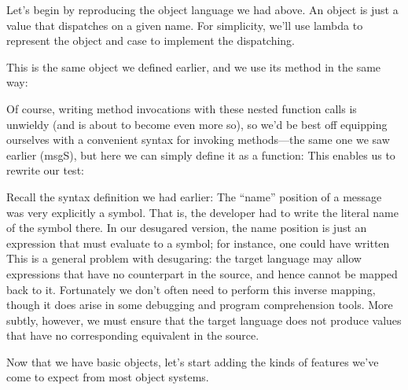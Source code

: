 
Let’s begin by reproducing the object language we had above. An object is just a
value that dispatches on a given name. For simplicity, we’ll use lambda to
represent the object and case to implement the dispatching.

This is the same object we defined earlier, and we use its method in the same
way:

Of course, writing method invocations with these nested function calls is
unwieldy (and is about to become even more so), so we’d be best off equipping
ourselves with a convenient syntax for invoking methods—the same one we saw
earlier (msgS), but here we can simply define it as a function:
This enables us to rewrite our test:


Recall the syntax definition we had earlier:
The “name” position of a message was very explicitly a symbol. That is, the
developer had to write the literal name of the symbol there. In our desugared
version, the name position is just an expression that must evaluate to a symbol;
for instance, one could have written
This is a general problem with desugaring: the target language may allow
expressions that have no counterpart in the source, and hence cannot be mapped
back to it. Fortunately we don’t often need to perform this inverse mapping,
though it does arise in some debugging and program comprehension tools. More
subtly, however, we must ensure that the target language does not produce values
that have no corresponding equivalent in the source.

Now that we have basic objects, let’s start adding the kinds of features we’ve
come to expect from most object systems.
